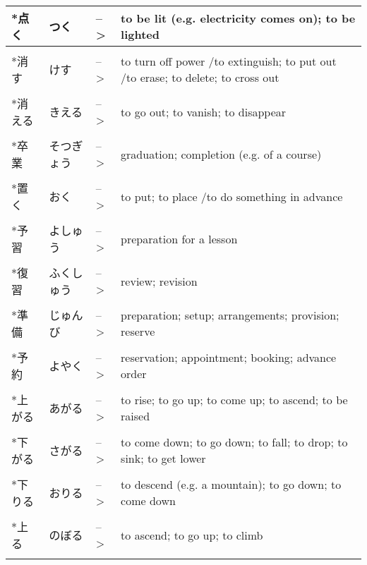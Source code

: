 \documentclass{article}
\begin{document}
\begin{tabular}{ l | l l p{13cm} }
*点く&つく&-->& to be lit (e.g. electricity comes on); to be lighted \\ \hline\\[-1em]
*消す&けす&-->& to turn off power /to extinguish; to put out /to erase; to delete; to cross out \\ \hline\\[-1em]
*消える&きえる&-->& to go out; to vanish; to disappear \\ \hline\\[-1em]
*卒業&そつぎょう&-->& graduation; completion (e.g. of a course) \\ \hline\\[-1em]
*置く&おく&-->& to put; to place /to do something in advance \\ \hline\\[-1em]
*予習&よしゅう&-->& preparation for a lesson \\ \hline\\[-1em]
*復習&ふくしゅう&-->& review; revision \\ \hline\\[-1em]
*準備&じゅんび&-->& preparation; setup; arrangements; provision; reserve \\ \hline\\[-1em]
*予約&よやく&-->& reservation; appointment; booking; advance order \\ \hline\\[-1em]
*上がる&あがる&-->& to rise; to go up; to come up; to ascend; to be raised \\ \hline\\[-1em]
*下がる&さがる&-->& to come down; to go down; to fall; to drop; to sink; to get lower \\ \hline\\[-1em]
*下りる&おりる&-->& to descend (e.g. a mountain); to go down; to come down \\ \hline\\[-1em]
*上る&のぼる&-->& to ascend; to go up; to climb \\ \hline\\[-1em]
\end{tabular}
\end{document}
